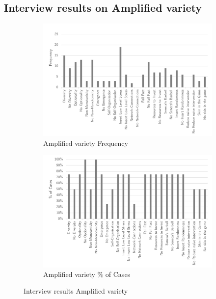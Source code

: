 \subsection{Interview results on Amplified variety}
\label{sub:interviewresultsaplified}
\begin{figure}[H]
	\centering
	\begin{subfigure}[H]{0.5\textwidth}
		\centering
		\includegraphics[width=0.95\linewidth]{images/amplified_frequency}
		\caption{Amplified variety Frequency}
		\label{fig:amplifiedfrequency}
	\end{subfigure}%
	\begin{subfigure}[H]{0.5\textwidth}
		\centering
		\includegraphics[width=0.95\linewidth]{images/amplified_cases}
		\caption{Amplified variety \% of Cases}
		\label{fig:amplifiedcases}
	\end{subfigure}
	\caption{Interview results Amplified variety}
	\label{fig:interviewamplifiedvariety}
\end{figure}

